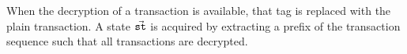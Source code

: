 

When the decryption of a transaction \txTag is available, that tag is replaced with the plain transaction.
%
A state $\vec{\mathtt{st}}$ is acquired by extracting a prefix of the transaction sequence \txSeqProposal such that all transactions are decrypted.


